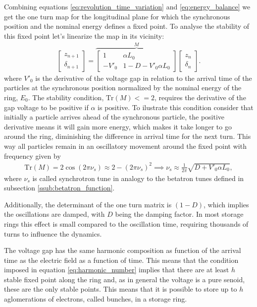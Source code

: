 \documentclass[
	12pt,				%
	openright,			%
	oneside,			%
	a4paper,		%
	chapter=TITLE,		%
	section=TITLE,		%
    brazil,				%
	english,			%
	sumario=tradicional,
	]{abntex2}
\begin{document}
	Combining equations \ref{eq:revolution_time_variation} and \ref{eq:energy_balance} we get the one turn map for the longitudinal plane for which the synchronous position and the nominal energy defines a fixed point. To analyse the stability of this fixed point let's linearize the map in its vicinity:
	\begin{align}
		\begin{bmatrix} z_{n+1} \\ \delta_{n+1}\end{bmatrix} = \overbrace{
			\begin{bmatrix} 1 & \alpha L_0 \\ -V'_0 & 1-D - V'_0\alpha L_0 \end{bmatrix}
		}^M \begin{bmatrix} z_n \\ \delta_n \end{bmatrix}.
	\end{align}
	where $V'_0$ is the derivative of the voltage gap in relation to the arrival time of the particles at the synchronous position normalized by the nominal energy of the ring, $E_0$. The stability condition, $\text{Tr}(M) <= 2$, requires the derivative of the gap voltage to be positive if $\alpha$ is positive. To ilustrate this condition consider that initially a particle arrives ahead of the synchronous particle, the positive derivative means it will gain more energy, which makes it take longer to go around the ring, diminishing the difference in arrival time for the next turn. This way all particles remain in an oscillatory movement around the fixed point with frequency given by
	\begin{align}
		\text{Tr}(M) = 2\cos(2\pi\nu_s) \approx 2-(2\pi\nu_s)^2 \implies
		\nu_s \approx \frac{1}{2\pi}\sqrt{D+V'_0\alpha L_0},
	\end{align}
	where $\nu_s$ is called synchrotron tune in analogy to the betatron tunes defined in subsection \ref{ssub:betatron_function}.

	Additionally, the determinant of the one turn matrix is $(1-D)$, which implies the oscillations are damped, with $D$ being the damping factor. In most storage rings this effect is small compared to the oscillation time, requiring thousands of turns to influence the dynamics.

	The voltage gap has the same harmonic composition as function of the arrival time as the electric field as a function of time. This means that the condition imposed in equation \ref{eq:harmonic_number} implies that there are at least $h$ stable fixed point along the ring and, as in general the voltage is a pure senoid, these are the only stable points. This means that it is possible to store up to $h$ aglomerations of electrons, called bunches, in a storage ring.
\end{document}
